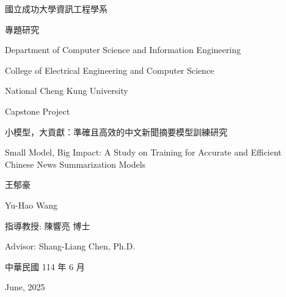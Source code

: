 \documentclass[12pt,a4paper,twocolumn]{report}
\begin{document}
\begin{titlepage}
    \begin{singlespace}
        \begin{center}
            \fontsize{18}{27}\selectfont
            國立成功大學資訊工程學系\par
            專題研究\par

            \fontsize{14}{21}\selectfont
            Department of Computer Science and Information Engineering\par
            College of Electrical Engineering and Computer Science\par

            \fontsize{16}{24}\selectfont
            National Cheng Kung University\par
            Capstone Project\par

            \vfill
            \fontsize{18}{27}\selectfont
            小模型，大貢獻：準確且高效的中文新聞摘要模型訓練研究\par
            Small Model, Big Impact: A Study on Training for Accurate and Efficient Chinese News Summarization Models\par
            \vfill
            王郁豪\par
            Yu-Hao Wang\par
            \vfill
            指導教授: 陳響亮 博士\par
            Advisor: Shang-Liang Chen, Ph.D.\par
            \vfill
            中華民國 114 年 6 月\par
            June, 2025
        \end{center}
    \end{singlespace}
\end{titlepage}
\clearpage
\restoregeometry

\end{document}
